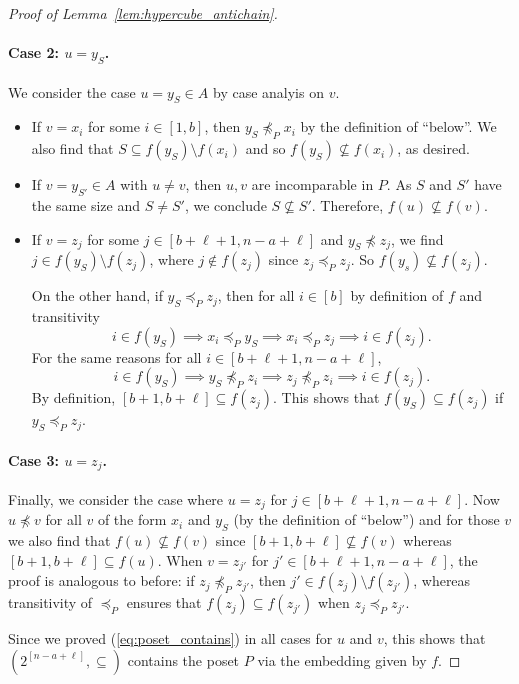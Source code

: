 \documentclass[10pt,a4paper]{amsart}
\def\cleq{\preccurlyeq}
\begin{document}
\begin{proof}[Proof of Lemma~\ref{lem:hypercube_antichain}]
\paragraph{Case 2: $u = y_S$.} 
We consider the case $u=y_S\in A$ by case analyis on $v$.
\begin{itemize}
    \item If $v=x_i$ for some $i\in [1,b]$, then $y_S\not\cleq_P x_i$ by the definition of ``below''. We also find that $S\subseteq f(y_S)\setminus f(x_i)$ and so $f(y_S)\not\subseteq f(x_i)$, as desired.
    \item If $v=y_{S'}\in A$ with $u\neq v$, then $u,v$ are incomparable in $P$. As $S$ and $S'$ have the same size and $S \neq S'$, we conclude $S \not \subseteq S'$. Therefore, $f(u) \not \subseteq f(v)$.
    
    \item If $v=z_j$ for some $j\in [b+\ell+1, n - a + \ell]$ and $y_S\not\cleq z_j$, we find $j\in f(y_S)\setminus f(z_j)$, where $j \not \in f(z_j)$ since $z_j \cleq_P z_j$. So $f(y_s)\not \subseteq f(z_j)$. 
    
    On the other hand, if $y_S\cleq_P z_j$, then for all $i\in [b]$ by definition of $f$ and transitivity \[
    i\in f(y_S)\implies 
    x_i\cleq_P y_S\implies x_i\cleq_P z_j \implies i\in f(z_j).
    \]
    For the same reasons for all $i\in [b+\ell+1,n-a+\ell]$,
    \[
    i\in f(y_S)\implies y_S\not\cleq_P z_i\implies z_j \not\cleq_P z_i\implies i\in f(z_j).
    \]
    By definition, $[b+1,b+\ell]\subseteq f(z_j)$. This shows that $f(y_S)\subseteq f(z_j)$ if $y_S\cleq_P z_j$.
\end{itemize}

\paragraph{Case 3: $u = z_j$.} Finally, we consider the case where $u=z_j$ for $j\in [b+\ell+1,n-a+\ell]$. Now $u\not\cleq v$ for all $v$ of the form $x_i$ and $y_S$ (by the definition of ``below'') and for those $v$ we also find that $f(u)\not\subseteq f(v)$ since $[b+1,b+\ell]\not\subseteq f(v)$ whereas $[b+1,b+\ell]\subseteq f(u)$. 
When $v=z_{j'}$ for $j'\in [b+\ell+1,n-a+\ell]$, the proof is analogous to before: if $z_j\not\cleq_P z_{j'}$, then $j'\in f(z_{j})\setminus f(z_{j'})$, whereas transitivity of $\cleq_P$ ensures that $f(z_j)\subseteq f(z_{j'})$ when $z_j\cleq_P z_{j'}$.

Since we proved (\ref{eq:poset_contains}) in all cases for $u$ and $v$, this shows that $(2^{[n-a+\ell]},\subseteq )$ contains the poset $P$ via the embedding given by $f$.
\end{proof}
\end{document}
